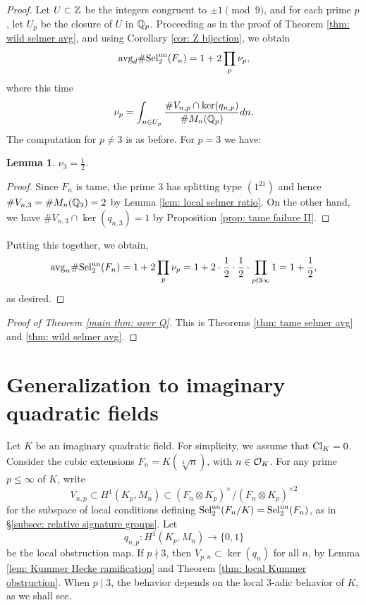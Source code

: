 \documentclass[11pt,a4paper]{amsart}
\def\Z{{\rm \mathbb{Z}}}
\def\Q{{\rm \mathbb{Q}}}
\def\O{{\rm \mathcal{O}}}
\def\un{{\rm un}}
\def\avg{{\rm avg}}
\def\Cl{{\rm Cl}}
\def\Sel{{\rm Sel}}
\numberwithin{equation}{section}
\newtheorem{lemma}[theorem]{Lemma}
\begin{document}
\begin{proof}
 Let $U \subset \Z$ be the integers congruent to $\pm 1\pmod9$, and for each prime $p$, let $U_p$ be the closure of $U$ in $\Q_p$. Proceeding as in the proof of Theorem \ref{thm: wild selmer avg}, and using Corollary \ref{cor: Z bijection}, we obtain
\[\avg_d \#\Sel_2^\un(F_n) = 1 + 2\prod_p \nu_p,\] 
where this time 
\[\nu_p = \int_{n \in U_p} \frac{\#V_{n,p} \cap \ker(q_{n,p})}{\#M_n(\Q_p)}dn.\]
The computation for $p \neq 3$ is as before. For $p = 3$ we have:

\begin{lemma}
$\nu_3 = \frac12$.
\end{lemma}
\begin{proof}
Since $F_n$ is tame, the prime $3$ has splitting type $(1^21)$ and hence $\#V_{n,3} = \#M_n(\Q_3) = 2$ by Lemma \ref{lem: local selmer ratio}. On the other hand, we have $\#V_{n,3} \cap \ker(q_{n,3})= 1$ by Proposition \ref{prop: tame failure II}. 
\end{proof}


Putting this together, we obtain,
\[\avg_n \#\Sel_2^\un(F_n) = 1 + 2\prod_p \nu_p =1 + 2\cdot \frac12 \cdot \frac12 \cdot \prod_{p \nmid 3\infty}  1 =  1 + \frac12,\]
as desired.
\end{proof}

\begin{proof}[Proof of Theorem \ref{main thm: over Q}]
This is Theorems \ref{thm: tame selmer avg} and \ref{thm: wild selmer avg}. 
\end{proof}

\section{Generalization to imaginary quadratic fields} \label{sec: imaginary quadratic fields}
Let $K$ be an imaginary quadratic field. For simplicity, we assume that $\Cl_K = 0$. Consider the cubic extensions $F_n = K(\sqrt[3]{n})$, with $n \in \O_K$.  For any prime $p \leq \infty$ of $K$, write 
\[V_{n,p} \subset H^1(K_p,M_n) \subset (F_n \otimes K_p)^\times/(F_n \otimes K_p)^{\times 2}\] 
for the subspace of local conditions defining $\Sel_2^\un(F_n/K) = \Sel_2^\un(F_n)$, as in \S\ref{subsec: relative signature groups}. Let 
\[q_{n,p} \colon H^1(K_p, M_n) \to \{0,1\}\] 
be the local obstruction map. If $p \nmid 3$, then $V_{p,n} \subset \ker(q_n)$ for all $n$, by Lemma \ref{lem: Kummer Hecke ramification} and Theorem \ref{thm: local Kummer obstruction}. When $p \mid 3$, the behavior depends on the local $3$-adic behavior of $K$, as we shall see.
\end{document}
